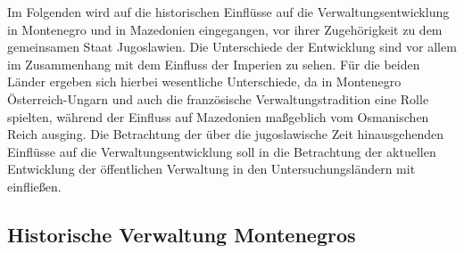 Im Folgenden wird auf die historischen Einflüsse auf die Verwaltungsentwicklung in Montenegro und in Mazedonien eingegangen, vor ihrer Zugehörigkeit zu dem gemeinsamen Staat Jugoslawien. Die Unterschiede der Entwicklung sind vor allem im Zusammenhang mit dem Einfluss der Imperien zu sehen. Für die beiden Länder ergeben sich hierbei wesentliche Unterschiede, da in Montenegro Österreich-Ungarn und auch die französische Verwaltungstradition eine Rolle spielten, während der Einfluss auf Mazedonien maßgeblich vom Osmanischen Reich ausging. Die Betrachtung der über die jugoslawische Zeit hinausgehenden Einflüsse auf die Verwaltungsentwicklung soll in die Betrachtung der aktuellen Entwicklung der öffentlichen Verwaltung in den Untersuchungsländern mit einfließen.


\subsection{Historische Verwaltung Montenegros }
